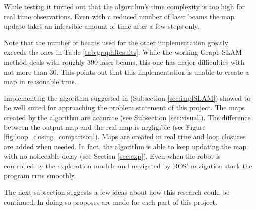 \documentclass{ba-kecs}
\begin{document}
While testing it turned out that the algorithm's time complexity is too high for real time observations. Even with a reduced number of laser beams the map update takes an infeasible amount of time after a few steps only. 
\begin{table}[h]
\begin{center}
\end{center}
\caption{The time the Graph SLAM implementation proposed by \citep{Thrun} needed using the specified number of laser beams after the specified number of steps}
\label{tab:graphResults}
\end{table}
Note that the number of beams used for the other implementation greatly exceeds the ones in Table \ref{tab:graphResults}. While the working Graph SLAM method deals with roughly 390 laser beams, this one has major difficulties with not more than 30.
This points out that this implementation is unable to create a map in reasonable time.

Implementing the algorithm suggested in \citep{Grisetti} (Subsection \ref{sec:implSLAM}) showed to be well suited for approaching the problem statement of this project. The maps created by the algorithm are accurate (see Subsection \ref{sec:visual}). The difference between the output map and the real map is negligible (see Figure \ref{fig:loop_closing_comparison}). Maps are created in real time and loop closures are added when needed. In fact, the algorithm is able to keep updating the map with no noticeable delay (see Section \ref{sec:exp}). Even when the robot is controlled by the exploration module and navigated by ROS' navigation stack the program runs smoothly.

The next subsection suggests a few ideas about how this research could be continued. In doing so proposes are made for each part of this project.
\end{document}
